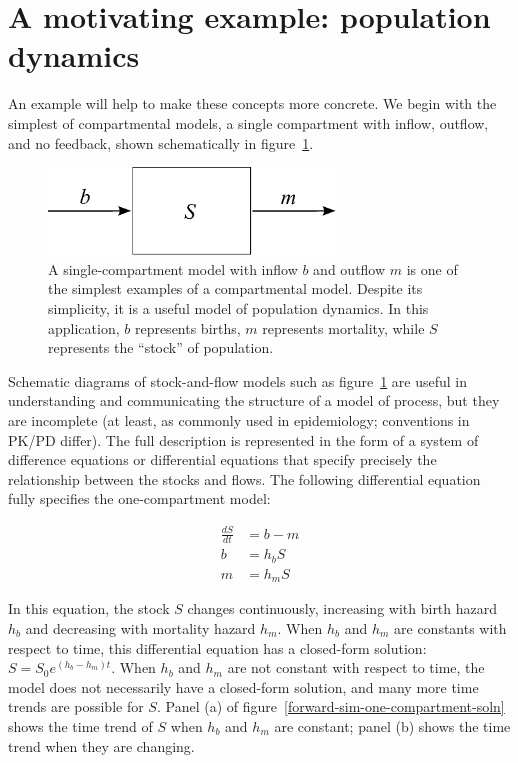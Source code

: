 \section{A motivating example: population dynamics}

An example will help to make these concepts more concrete.  We begin
with the simplest of compartmental models, a single compartment with
inflow, outflow, and no feedback, shown schematically in
figure~\ref{forward-sim-one-compartment}.

\begin{figure}[h]
\begin{center}
\includegraphics[width=3in]{S.pdf}
\caption{A single-compartment model with inflow $b$ and outflow $m$
  is one of the simplest examples of a compartmental model. Despite
  its simplicity, it is a useful model of population dynamics.  In
  this application, $b$ represents births, $m$ represents
  mortality, while $S$ represents the ``stock'' of
  population.}
\label{forward-sim-one-compartment}
\end{center}
\end{figure}


Schematic diagrams of stock-and-flow models such as
figure~\ref{forward-sim-one-compartment} are useful in understanding
and communicating the structure of a model of process, but they are
incomplete (at least, as commonly used in epidemiology; conventions in
PK/PD differ). The full description is represented in the form of a
system of difference equations or differential equations that specify
precisely the relationship between the stocks and flows. The following
differential equation fully specifies the one-compartment model:

\begin{align*}
\frac{dS}{dt}&= b - m\\
b&=h_b S\\
m&=h_m S
\end{align*}

In this equation, the stock $S$ changes continuously, increasing with
birth hazard $h_b$ and decreasing with mortality hazard $h_m$. When
$h_b$ and $h_m$ are constants with respect to time, this differential
equation has a closed-form solution: $S = S_0 e^{(h_b-h_m)t}$. When
$h_b$ and $h_m$ are not constant with respect to time, the model does
not necessarily have a closed-form solution, and many more time trends
are possible for $S$.  Panel (a) of figure~\ref{forward-sim-one-compartment-soln}
shows the time trend of $S$ when $h_b$ and $h_m$ are constant; panel
(b) shows the time trend when they are changing.


